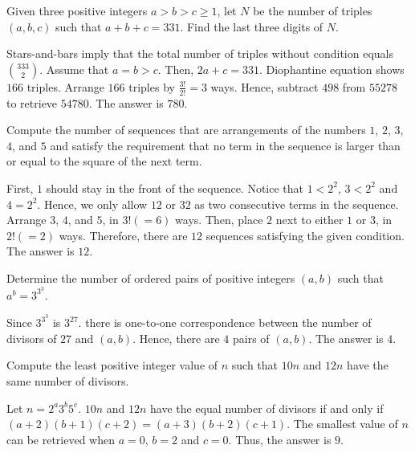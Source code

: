 \begin{problem}
Given three positive integers $a>b>c\geq1$, let $N$ be the number of triples $(a,b,c)$ such that $a+b+c=331$. Find the last three digits of $N$.
\end{problem}

\begin{solution}
Stars-and-bars imply that the total number of triples without condition equals $\binom{333}{2}$. Assume that $a=b>c$. Then, $2a+c=331$. Diophantine equation shows $166$ triples. Arrange $166$ triples by $\frac{3!}{2!}=3$ ways. Hence, subtract $498$ from $55278$ to retrieve $54780$. The answer is $780$.
\end{solution}

\begin{problem}
Compute the number of sequences that are arrangements of the numbers $1$, $2$, $3$, $4$, and $5$ and satisfy the requirement that no term in the sequence is larger than or equal to the square of the next term.
\end{problem}

\begin{solution}
First, $1$ should stay in the front of the sequence. Notice that $1<2^2$, $3<2^2$ and $4=2^2$. Hence, we only allow $12$ or $32$ as two consecutive terms in the sequence. Arrange $3$, $4$, and $5$, in $3!(=6)$ ways. Then, place $2$ next to either $1$ or $3$, in $2!(=2)$ ways. Therefore, there are $12$ sequences satisfying the given condition. The answer is $12$.
\end{solution}

\begin{problem}
Determine the number of ordered pairs of positive integers $(a,b)$ such that $a^b=3^{3^3}$.
\end{problem}

\begin{solution}
Since $3^{3^3}$ is $3^{27}$. there is one-to-one correspondence between the number of divisors of $27$ and $(a,b)$. Hence, there are $4$ pairs of $(a,b)$. The answer is $4$.
\end{solution}

\begin{problem}
Compute the least positive integer value of $n$ such that $10n$ and $12n$ have the same number of divisors.
\end{problem}

\begin{solution}
Let $n=2^a3^b5^c$. $10n$ and $12n$ have the equal number of divisors if and only if $(a+2)(b+1)(c+2)=(a+3)(b+2)(c+1)$. The smallest value of $n$ can be retrieved when $a=0$, $b=2$ and $c=0$. Thus, the answer is $9$.
\end{solution}

